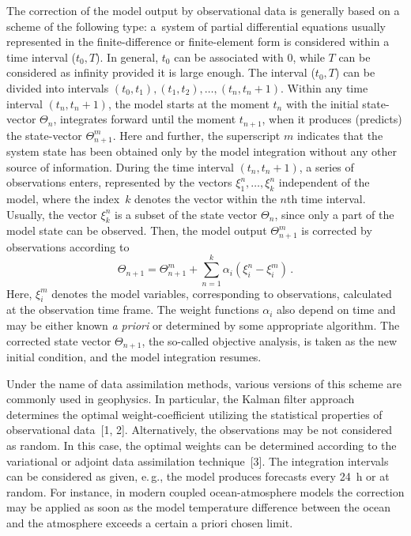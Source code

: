 \begin{multicols}{2}
The correction of the model output by observational data is generally based on a scheme 
of the following type: a~system of partial differential equations usually represented in 
the finite-difference or finite-element form is considered within a time interval ($ t_0,T $). 
In general, $ t_0 $ can be associated with $0$, while $T$ 
can be considered as infinity provided it is large enough. The interval ($ t_0,T $) can be 
divided into intervals 
$(t_0,t_1), (t_1,t_2),\ldots, (t_n,t_n+1) $. Within any time interval $(t_n,t_n+1)$,  the
model starts at the moment $t_n$ with the initial state-vector $\Theta_n$, integrates 
forward until the moment $t_{n+1}$, when it produces (predicts) the state-vector 
$\Theta^m_{n+1}$. Here and further, the superscript $m$ indicates that the system state 
has been obtained only by the model integration without any other source of information. 
During the time interval $(t_n,t_n+1)$, a series of observations enters, represented by
the vectors $ \xi^n_1,\ldots, \xi^n_k$  independent of the model, where the index~$k$ 
denotes the vector within the $n$th time interval. Usually, the vector $\xi^n_k$ 
is a subset of the state vector $\Theta_n$, since only a part of the model state can be observed. 
Then, the model output $\Theta^m_{n+1}$ is corrected by observations according to
$$
\Theta_{n+1}= \Theta^m_{n+1}+\sum\limits_{n=1}^{k} \alpha_i (\xi^n_i - \xi^m_i)\,.
$$
Here, $\xi^m_i$ denotes the model variables, corresponding to observations, calculated 
at the observation time frame. The weight functions $\alpha_i $ also depend on time and 
may be either known \textit{a priori}  or determined by some appropriate algorithm. 
The corrected state vector $\Theta_{n+1}$, the so-called objective analysis, 
is taken as the new initial condition, and the model integration resumes.

Under the name of data assimilation methods, various versions of this scheme are commonly 
used in geophysics. In particular, the Kalman filter approach determines the optimal 
weight-coefficient   utilizing the statistical properties of observational data~[1, 2]. 
Alternatively, the observations may be not considered as random. In this case, the optimal 
weights can be determined according to the variational or adjoint data assimilation technique~[3]. 
The integration intervals can be considered as given, e.\,g., the model produces forecasts every 
24~h or at random. For instance, in modern coupled ocean-atmosphere models the correction 
may be applied as soon as the model temperature difference between the ocean and the atmosphere exceeds 
a certain a priori chosen limit.


\end{multicols}
